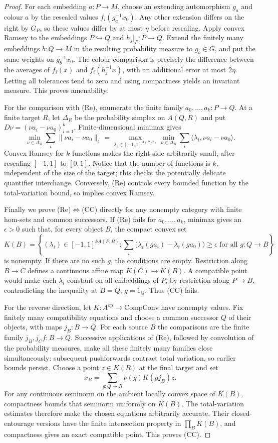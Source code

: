 \begin{proof}
For each embedding $a:P\to M$, choose an extending automorphism
$g_a$ and colour $a$ by the rescaled values
$f_i(g_a^{-1}x_0)$. Any other extension differs on the right by
$G_P$, so these values differ by at most $\eta$ before rescaling.
Apply convex Ramsey to the embeddings $P\hookrightarrow Q$ and
$h_j|_P:P\to Q$. Extend the finitely many embeddings $b:Q\to M$
in the resulting probability measure to $g_b\in G$, and put the
same weights on $g_b^{-1}x_0$. The colour comparison is precisely
the difference between the averages of $f_i(x)$ and
$f_i(h_j^{-1}x)$, with an additional error at most $2\eta$.
Letting all tolerances tend to zero and using compactness yields an
invariant measure. This proves amenability.

For the comparison with (Re), enumerate the finite family
$a_0,\ldots,a_k:P\to Q$. At a finite target $R$, let $\Delta_R$
be the probability simplex on $A(Q,R)$ and put
$D\nu=(\nu a_i-\nu a_0)_{i=1}^k$. Finite-dimensional minimax gives
\[
 \min_{\nu\in\Delta_R}\sum_i\|\nu a_i-\nu a_0\|_1
 =\max_{\lambda_i\in[-1,1]^{A(P,R)}}
   \min_{\nu\in\Delta_R}\sum_i\langle\lambda_i,\nu a_i-\nu a_0\rangle.
\]
Convex Ramsey for $k$ functions makes the right side arbitrarily
small, after rescaling $[-1,1]$ to $[0,1]$. Notice that the number
of functions is $k$, independent of the size of the target; this
checks the potentially delicate quantifier interchange. Conversely,
(Re) controls every bounded function by the total-variation bound,
so implies convex Ramsey.

Finally we prove (Re)$\Leftrightarrow$(CC) directly for any nonempty
category with finite hom-sets and common successors. If (Re) fails
for $a_0,\ldots,a_k$, minimax gives an $\epsilon>0$ such that, for
every object $B$, the compact convex set
\[
 K(B)=\left\{(\lambda_i)\in[-1,1]^{kA(P,B)}:
 \sum_i\bigl(\lambda_i(ga_i)-\lambda_i(ga_0)\bigr)\geq\epsilon
 \text{ for all }g:Q\to B\right\}
\]
is nonempty. If there are no such $g$, the conditions are empty.
Restriction along $B\to C$ defines a continuous affine map
$K(C)\to K(B)$. A compatible point would make each $\lambda_i$
constant on all embeddings of $P$, by restriction along $P\to B$,
contradicting the inequality at $B=Q$, $g=1_Q$. Thus (CC) fails.

For the reverse direction, let $K:A^{\mathrm{op}}\to\mathrm{CompConv}$
have nonempty values. Fix finitely many compatibility equations and
choose a common successor $Q$ of their objects, with maps $j_B:B\to Q$.
For each source $B$ the comparisons are the finite family
$j_B,j_Cf:B\to Q$. Successive applications of (Re), followed by
convolution of the probability measures, make all these finitely
many families close simultaneously: subsequent pushforwards
contract total variation, so earlier bounds persist. Choose a
point $z\in K(R)$ at the final target and set
\[
 x_B=\sum_{g:Q\to R}\nu(g)K(gj_B)z.
\]
For any continuous seminorm on the ambient locally convex space of
$K(B)$, compactness bounds that seminorm uniformly on $K(B)$.
The total-variation estimates therefore make the chosen equations
arbitrarily accurate. Their closed-entourage versions have the
finite intersection property in $\prod_BK(B)$, and compactness
gives an exact compatible point. This proves (CC).
\end{proof}

